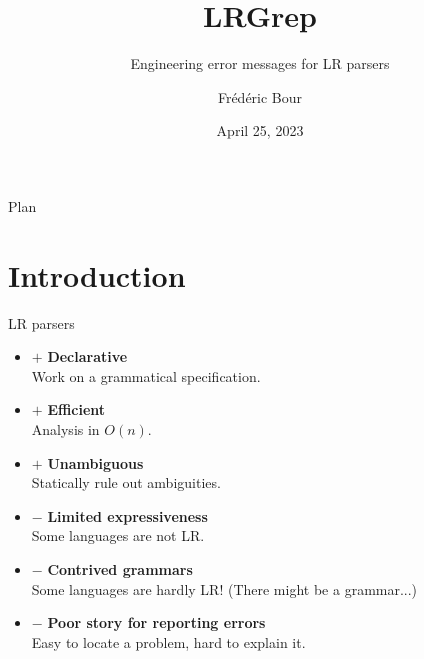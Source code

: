 \documentclass{beamer}          %
\title{LRGrep}  %
\subtitle{Engineering error messages for LR parsers}
\author{Frédéric Bour}                %
\institute{Tarides, Inria}          %
\date{April 25, 2023}                  %
\begin{document}
\begin{frame}
  \titlepage
\end{frame}

\begin{frame}{Plan}
  \tableofcontents
\end{frame}


\section{Introduction}

\newcommand\pro{\item[$+$]}
\newcommand\con{\item[$-$]}

\begin{frame}{LR parsers}

  \begin{itemize}
    \pro \textbf{Declarative} \\
         {\small Work on a grammatical specification.}
    \pro \textbf{Efficient} \\
         {\small Analysis in $O(n)$.}
    \pro \textbf{Unambiguous} \\
         {\small Statically rule out ambiguities.}
    \pause
    \con \textbf{Limited expressiveness} \\
         {\small Some languages are not LR.}
    \con \textbf{Contrived grammars} \\
         {\small Some languages are hardly LR! (There might be a grammar...)}
    \con \textbf{Poor story for reporting errors} \\
         {\small Easy to locate a problem, hard to explain it.}
  \end{itemize}

\end{frame}
\end{document}
